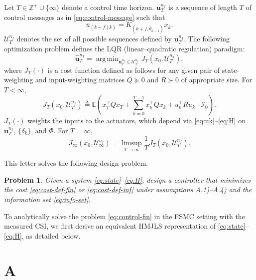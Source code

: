 \documentclass[journal,twoside,web]{ieeecolor}
\newtheorem{problem}{Problem}
\begin{document}
Let $T\in\mathbb{Z}^{+} \cup \{\infty\}$ denote a control time horizon. $\bm{u}_{T}^{n_f}$ is a sequence of length $T$ of control messages as in \eqref{eq:control-message} such that
\begin{equation}\label{eq:control-seq}
    \bar{u}_{(k+f\mid k)} = K_{(k+f,\hat{\theta}_{k-1})}x_k.
\end{equation}
$\mathcal{U}_{T}^{n_f}$ denotes the set of all possible sequences defined by $\bm{u}_{T}^{n_f}$.
The following optimization problem defines
the LQR (linear--quadratic regulation) paradigm:
\begin{equation}\label{eq:control-fin}
    \hat{\bm{u}}_{T}^{n_f} = \mathop{\mathrm{arg\,min}}_{\bm{u}_{T}^{n_f} \in \mathcal{U}_{T}^{n_f}} J_{T}^{}(x_0,\mathcal{U}_{T}^{n_f}),
\end{equation}
where $J_{T}^{}(\cdot)$ is a cost function defined as follows for any given pair of state-weighting and input-weighting matrices $Q\succeq 0$ and $R \succ 0$ of appropriate size.
For $T<\infty$,
\begin{equation}\label{eq:cost-def-fin}
    J_{T}^{}(x_0,\mathcal{U}_{T}^{n_f}) \!\triangleq \mathbb{E}(x_T^{\top} Q x_T +\! \sum_{k=0}^{T-1} x_k^{\top} Q x_k + u_k^{\top}Ru_k \mid \mathcal{I}_0).
\end{equation}
$J_{T}^{}(\cdot)$ weights the inputs to the actuators, which depend via \eqref{eq:uk}--\eqref{eq:H} on $\bm{u}_{T}^{n_f}$, $\{\delta_k\}$, and $\mathit{\Phi}$. For $T=\infty$, 
\begin{equation}\label{eq:cost-def-inf}
    J_{\infty}^{}(x_0,\mathcal{U}_{\infty}^{n_f}) = \limsup_{T\to\infty} \frac{1}{T} J_{T}^{}(x_0,\mathcal{U}_{T}^{n_f}).
\end{equation}

This letter solves the following design problem.

\begin{problem}
   Given a system \eqref{eq:state}--\eqref{eq:H}, design a controller that minimizes the cost \eqref{eq:cost-def-fin} or \eqref{eq:cost-def-inf} under assumptions A.1)--A.4) and the information set \eqref{eq:info-set}.
\end{problem}

To analytically solve the problem \eqref{eq:control-fin} in the FSMC setting with the measured CSI, we first derive an equivalent HMJLS representation of \eqref{eq:state}--\eqref{eq:H}, as detailed below. 

\section{A}\label{sec:}
\end{document}
